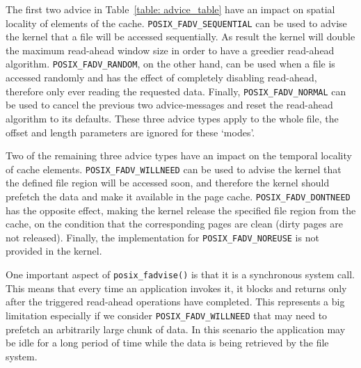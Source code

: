 The first two advice in Table~\ref{table: advice_table} have an impact on spatial locality of elements of the cache. \texttt{POSIX\_FADV\_SEQUENTIAL} can be used to advise the kernel that a file will be accessed sequentially. As result the kernel will double the maximum read-ahead window size in order to have a greedier read-ahead algorithm. \texttt{POSIX\_FADV\_RANDOM}, on the other hand, can be used when a file is accessed randomly and has the effect of completely disabling read-ahead, therefore only ever reading the requested data. Finally, \texttt{POSIX\_FADV\_NORMAL} can be used to cancel the previous two advice-messages and reset the read-ahead algorithm to its defaults. These three advice types apply to the whole file, the offset and length parameters are ignored for these `modes'.

Two of the remaining three advice types have an impact on the temporal locality of cache elements. \texttt{POSIX\_FADV\_WILLNEED} can be used to advise the kernel that the defined file region will be accessed soon, and therefore the kernel should prefetch the data and make it available in the page cache. \texttt{POSIX\_FADV\_DONTNEED} has the opposite effect, making the kernel release the specified file region from the cache, on the condition that the corresponding pages are clean (dirty pages are not released). Finally, the implementation for \texttt{POSIX\_FADV\_NOREUSE} is not provided in the kernel. %

One important aspect of \texttt{posix\_fadvise()} is that it is a synchronous system call. This means that every time an application invokes it, it blocks and returns only after the triggered read-ahead operations have completed. This represents a big limitation especially if we consider \texttt{POSIX\_FADV\_WILLNEED} that may need to prefetch an arbitrarily large chunk of data. In this scenario the application may be idle for a long period of time while the data is being retrieved by the file system.


